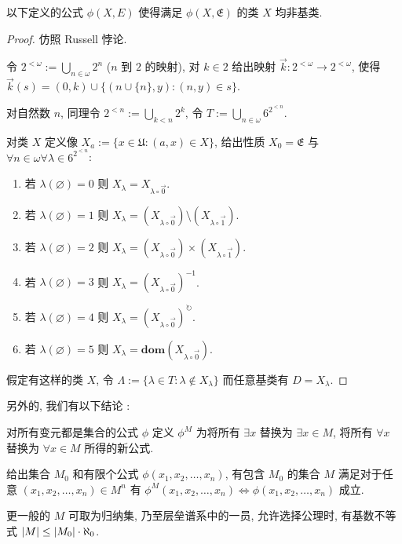 \begin{lemma}
    以下定义的公式 \(\phi (X, E)\) 使得满足 \(\phi (X, \mathfrak{E})\) 的类 \(X\) 均非基类.

    \begin{proof}
        仿照 Russell 悖论.

        令 \(2^{< \omega} := \bigcup_{n \in \omega} 2^n\) (\(n\) 到 \(2\) 的映射), 对 \(k \in 2\) 给出映射 \(\vec{k} : 2^{< \omega} \to 2^{< \omega}\),
        使得 \(\vec{k}(s) = {(0,k)} \cup \{(n \cup \{n\}, y) : (n,y) \in s\}\).

        对自然数 \(n\), 同理令 \(2^{<n} := \bigcup_{k < n} 2^k\), 令 \(T := \bigcup_{n \in \omega} 6^{2^{<n}}\).

        对类 \(X\) 定义像 \(X_a := \{x \in \mathfrak{U} : (a,x) \in X\}\), 给出性质 \(X_0 = \mathfrak{E}\) 与 \(\forall n \in \omega \forall \lambda \in 6^{2^{<n}}\):

        \begin{enumerate}
            \item 若 \(\lambda (\varnothing) = 0\) 则 \(X_\lambda = X_{\lambda \circ \vec{0}}\).
            \item 若 \(\lambda (\varnothing) = 1\) 则 \(X_\lambda = (X_{\lambda \circ \vec{0}}) \setminus (X_{\lambda \circ \vec{1}})\).
            \item 若 \(\lambda (\varnothing) = 2\) 则 \(X_\lambda = (X_{\lambda \circ \vec{0}}) \times (X_{\lambda \circ \vec{1}})\).
            \item 若 \(\lambda (\varnothing) = 3\) 则 \(X_\lambda = {(X_{\lambda \circ \vec{0}})}^{-1}\).
            \item 若 \(\lambda (\varnothing) = 4\) 则 \(X_\lambda = {(X_{\lambda \circ \vec{0}})}^{\circlearrowright}\).
            \item 若 \(\lambda (\varnothing) = 5\) 则 \(X_\lambda = \mathbf{dom} (X_{\lambda \circ \vec{0}})\).
        \end{enumerate}

        假定有这样的类 \(X\), 令 \(\Lambda := \{\lambda \in T:\lambda \notin X_{\lambda}\}\) 而任意基类有 \(D = X_\lambda\).
    \end{proof}
\end{lemma}

另外的, 我们有以下结论 \cite[\href{https://stacks.math.columbia.edu/tag/000G}{Tag 000G}]{stacks-project}:

\begin{theorem}
    \label {theorem:reflection principle}
    对所有变元都是集合的公式 \(\phi\) 定义 \(\phi^M\) 为将所有 \(\exists x\) 替换为 \(\exists x \in M\), 将所有 \(\forall x\) 替换为 \(\forall x \in M\) 所得的新公式.

    给出集合 \(M_0\) 和有限个公式 \(\phi(x_1, x_2, \dots, x_n)\), 有包含 \(M_0\) 的集合 \(M\) 满足对于任意 \((x_1, x_2, \dots, x_n) \in M^n\) 有 
    \(\phi^M(x_1, x_2, \dots, x_n) \iff \phi(x_1, x_2, \dots, x_n)\) 成立.

    更一般的 \(M\) 可取为归纳集, 乃至层垒谱系中的一员, 允许选择公理时, 有基数不等式 \(\abs{M} \le \abs{M_0} \cdot \aleph_0\).
\end{theorem}

